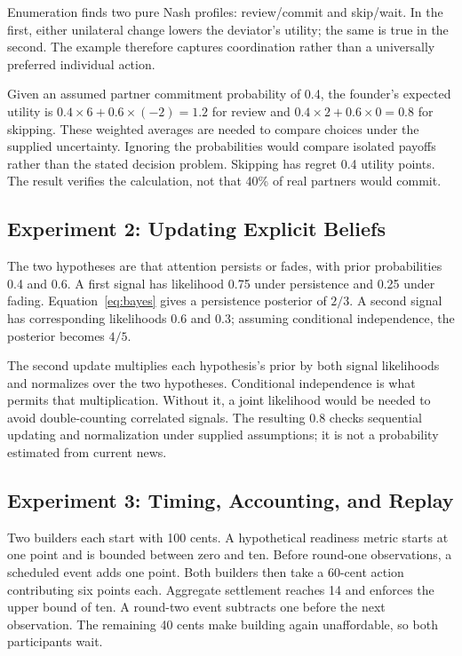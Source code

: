 Enumeration finds two pure Nash profiles: review/commit and skip/wait.
In the first, either unilateral change lowers the deviator's utility; the
same is true in the second. The example therefore captures coordination
rather than a universally preferred individual action.

Given an assumed partner commitment probability of 0.4, the founder's
expected utility is $0.4\times6+0.6\times(-2)=1.2$ for review and
$0.4\times2+0.6\times0=0.8$ for skipping. These weighted averages are needed
to compare choices under the supplied uncertainty. Ignoring the probabilities
would compare isolated payoffs rather than the stated decision problem.
Skipping has regret 0.4 utility points. The result verifies the calculation,
not that 40\% of real partners would commit.

\subsection{Experiment 2: Updating Explicit Beliefs}
The two hypotheses are that attention persists or fades, with prior
probabilities 0.4 and 0.6. A first signal has likelihood 0.75 under persistence
and 0.25 under fading. Equation~\eqref{eq:bayes} gives a persistence posterior
of $2/3$. A second signal has corresponding likelihoods 0.6 and 0.3; assuming
conditional independence, the posterior becomes $4/5$.

The second update multiplies each hypothesis's prior by both signal
likelihoods and normalizes over the two hypotheses. Conditional independence
is what permits that multiplication. Without it, a joint likelihood would
be needed to avoid double-counting correlated signals. The resulting 0.8
checks sequential updating and normalization under supplied assumptions;
it is not a probability estimated from current news.

\subsection{Experiment 3: Timing, Accounting, and Replay}
Two builders each start with 100 cents. A hypothetical readiness metric
starts at one point and is bounded between zero and ten. Before round-one
observations, a scheduled event adds one point. Both builders then take a
60-cent action contributing six points each. Aggregate settlement reaches
14 and enforces the upper bound of ten. A round-two event subtracts one
before the next observation. The remaining 40 cents make building again
unaffordable, so both participants wait.

